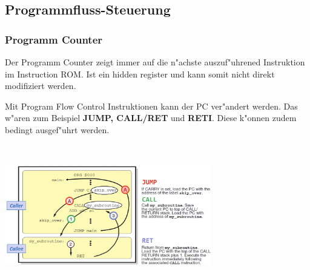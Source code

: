 \subsection{Programmfluss-Steuerung}
\subsubsection{Programm Counter}
\begin{minipage}{9cm}
	\vspace{-10ex}
	Der Programm Counter zeigt immer auf die n"achste auszuf"uhrened Instruktion im Instruction ROM. Ist ein hidden register und kann somit nicht direkt modifiziert werden. 

	Mit Program Flow Control Instruktionen kann der PC ver"andert werden. Das w"aren zum Beispiel \textbf{JUMP, CALL/RET} und \textbf{RETI}. Diese k"onnen zudem bedingt ausgef"uhrt werden.
\end{minipage}
%
\begin{minipage}{0.5cm}
	\ \
\end{minipage}
%
\begin{minipage}{9cm}
	\includegraphics[width=9cm]{pics/Ablauf_Synchron}
\end{minipage}

